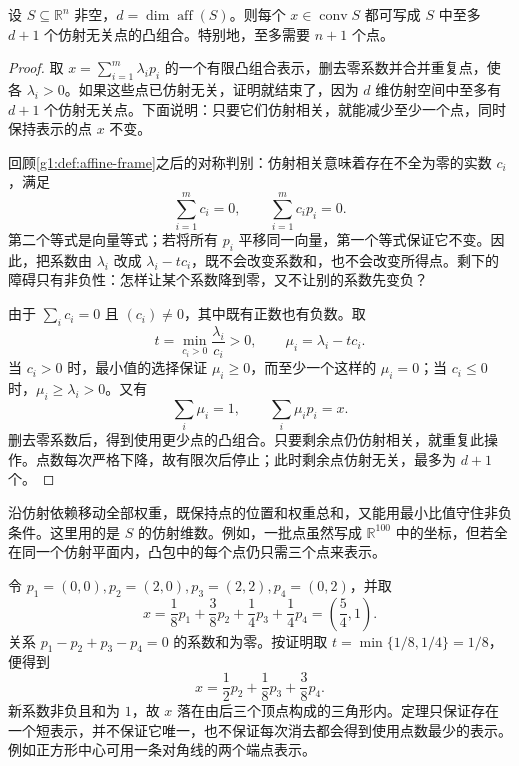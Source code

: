 \begin{theorem}[Carathéodory 定理]\label{g1:thm:caratheodory}
	设 \(S\subseteq\mathbb R^n\) 非空，\(d=\dim\operatorname{aff}(S)\)。则每个 \(x\in\operatorname{conv}S\) 都可写成 \(S\) 中至多 \(d+1\) 个仿射无关点的凸组合。特别地，至多需要 \(n+1\) 个点。
\end{theorem}
\begin{proof}
	取 \(x=\sum_{i=1}^m\lambda_i p_i\) 的一个有限凸组合表示，删去零系数并合并重复点，使各 \(\lambda_i>0\)。如果这些点已仿射无关，证明就结束了，因为 \(d\) 维仿射空间中至多有 \(d+1\) 个仿射无关点。下面说明：只要它们仿射相关，就能减少至少一个点，同时保持表示的点 \(x\) 不变。

	回顾\cref{g1:def:affine-frame}之后的对称判别：仿射相关意味着存在不全为零的实数 \(c_i\)，满足
	\[
		\sum_{i=1}^m c_i=0,\qquad \sum_{i=1}^m c_i p_i=0.
	\]
	第二个等式是向量等式；若将所有 \(p_i\) 平移同一向量，第一个等式保证它不变。因此，把系数由 \(\lambda_i\) 改成 \(\lambda_i-tc_i\)，既不会改变系数和，也不会改变所得点。剩下的障碍只有非负性：怎样让某个系数降到零，又不让别的系数先变负？

	由于 \(\sum_i c_i=0\) 且 \((c_i)\ne0\)，其中既有正数也有负数。取
	\[
		t=\min_{c_i>0}\frac{\lambda_i}{c_i}>0,\qquad \mu_i=\lambda_i-tc_i.
	\]
	当 \(c_i>0\) 时，最小值的选择保证 \(\mu_i\ge0\)，而至少一个这样的 \(\mu_i=0\)；当 \(c_i\le0\) 时，\(\mu_i\ge\lambda_i>0\)。又有
	\[
		\sum_i\mu_i=1,\qquad \sum_i\mu_i p_i=x.
	\]
	删去零系数后，得到使用更少点的凸组合。只要剩余点仍仿射相关，就重复此操作。点数每次严格下降，故有限次后停止；此时剩余点仿射无关，最多为 \(d+1\) 个。
\end{proof}

沿仿射依赖移动全部权重，既保持点的位置和权重总和，又能用最小比值守住非负条件。这里用的是 \(S\) 的仿射维数。例如，一批点虽然写成 \(\mathbb R^{100}\) 中的坐标，但若全在同一个仿射平面内，凸包中的每个点仍只需三个点来表示。

\begin{example}\label{g1:exm:convex-coefficient-reduction}
	令 \(p_1=(0,0),p_2=(2,0),p_3=(2,2),p_4=(0,2)\)，并取
	\[
		x=\frac18p_1+\frac38p_2+\frac14p_3+\frac14p_4=\left(\frac54,1\right).
	\]
	关系 \(p_1-p_2+p_3-p_4=0\) 的系数和为零。按证明取 \(t=\min\{1/8,1/4\}=1/8\)，便得到
	\[
		x=\frac12p_2+\frac18p_3+\frac38p_4.
	\]
	新系数非负且和为 \(1\)，故 \(x\) 落在由后三个顶点构成的三角形内。定理只保证存在一个短表示，并不保证它唯一，也不保证每次消去都会得到使用点数最少的表示。例如正方形中心可用一条对角线的两个端点表示。
\end{example}

